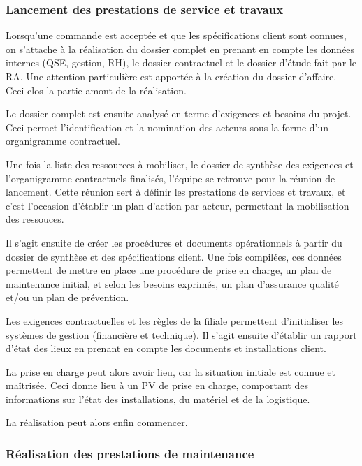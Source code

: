 \subsubsection{Lancement des prestations de service et travaux}

Lorsqu'une commande est acceptée et que les spécifications client sont connues, on s'attache à la réalisation du dossier complet en prenant en compte les données internes (QSE, gestion, RH), le dossier contractuel et le dossier d'étude fait par le RA. Une attention particulière est apportée à la création du dossier d'affaire. Ceci clos la partie amont de la réalisation.

Le dossier complet est ensuite analysé en terme d'exigences et besoins du projet. Ceci permet l'identification et la nomination des acteurs sous la forme d'un organigramme contractuel.

Une fois la liste des ressources à mobiliser, le dossier de synthèse des exigences et l'organigramme contractuels finalisés, l'équipe se retrouve pour la réunion de lancement. Cette réunion sert à définir les prestations de services et travaux, et c'est l'occasion d'établir un plan d'action par acteur, permettant la mobilisation des ressouces\footnotemark.


Il s’agit ensuite de créer les procédures et documents opérationnels à partir du dossier de synthèse et des spécifications client. Une fois compilées, ces données permettent de mettre en place une procédure de prise en charge, un plan de maintenance initial, et selon les besoins exprimés, un plan d’assurance qualité et/ou un plan de prévention.

Les exigences contractuelles et les règles de la filiale permettent d'initialiser les systèmes de gestion (financière et technique). Il s'agit ensuite d'établir un rapport d'état des lieux en prenant en compte les documents et installations client.

La prise en charge peut alors avoir lieu, car la situation initiale est connue et maîtrisée. Ceci donne lieu à un PV de prise en charge, comportant des informations sur l'état des installations, du matériel et de la logistique.

La réalisation peut alors enfin commencer.

\subsubsection{Réalisation des prestations de maintenance}

